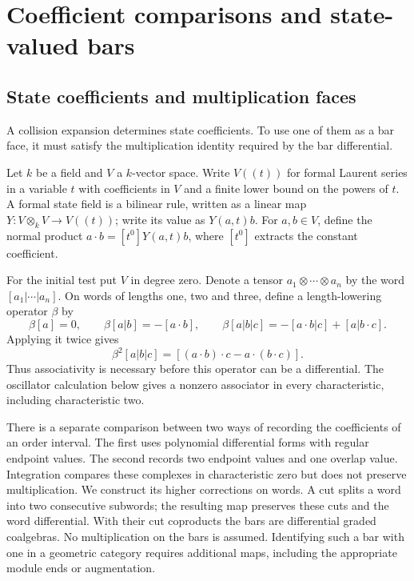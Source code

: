 \section{Coefficient comparisons and state-valued bars}
\label{sec:ordered-state-bars}

\subsection{State coefficients and multiplication faces}
\label{sb:sec:state-coefficient-bars}

A collision expansion determines state coefficients.  To use one
of them as a bar face, it must satisfy the multiplication identity
required by the bar differential.

Let \(k\) be a field and \(V\) a \(k\)-vector space.
Write \(V((t))\) for formal Laurent series in a variable \(t\)
with coefficients in \(V\) and a finite lower bound on the powers
of \(t\).  A formal state field is a bilinear rule, written as a
linear map \(Y:V\otimes_kV\to V((t))\); write its value as \(Y(a,t)b\).
For \(a,b\in V\), define the normal product
\(a\cdot b=[t^0]Y(a,t)b\), where \([t^0]\) extracts the
constant coefficient.

For the initial test put \(V\) in degree zero.  Denote a tensor
\(a_1\otimes\cdots\otimes a_n\) by the word
\([a_1|\cdots|a_n]\).  On words of lengths one, two and three,
define a length-lowering operator \(\beta\) by
\[
 \beta[a]=0,\qquad
 \beta[a|b]=-[a\cdot b],\qquad
 \beta[a|b|c]=-[a\cdot b|c]+[a|b\cdot c].
\]
Applying it twice gives
\[
 \beta^2[a|b|c]=[(a\cdot b)\cdot c-a\cdot(b\cdot c)].
\]
Thus associativity is necessary before this operator can be a
differential.  The oscillator calculation below gives a nonzero
associator in every characteristic, including characteristic two.

There is a separate comparison between two ways of recording the
coefficients of an order interval.  The first uses polynomial
differential forms with regular endpoint values.  The second records
two endpoint values and one overlap value.  Integration compares these
complexes in characteristic zero but does not preserve multiplication.
We construct its higher corrections on words.  A cut splits a word
into two consecutive subwords; the resulting map preserves these cuts
and the word differential.  With their cut coproducts the bars are
differential graded coalgebras.  No multiplication on the bars is
assumed.  Identifying such a bar with one in a geometric category
requires additional maps, including the appropriate module ends or
augmentation.

